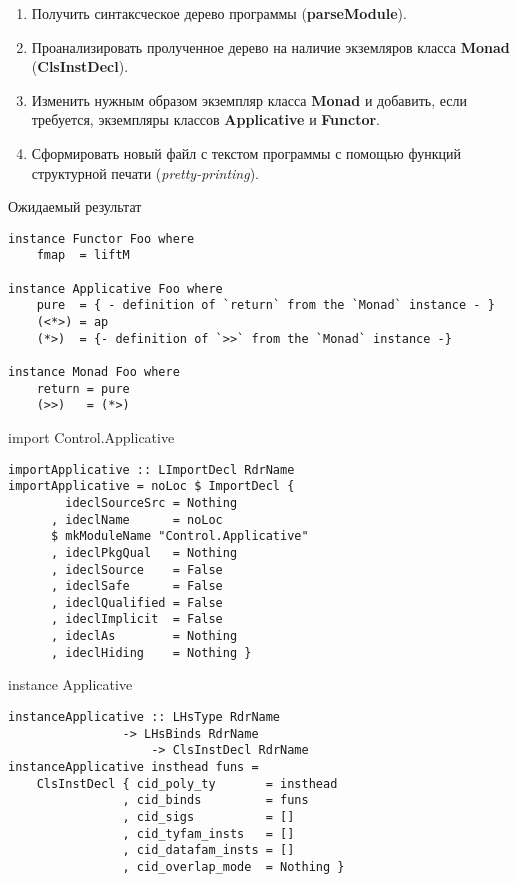 \documentclass [12 pt ] {beamer}
\begin{document}
    \begin{frame}
        \begin{enumerate}
            \item Получить синтаксческое дерево программы 
                (\textbf{parseModule}).
            \item Проанализировать пролученное дерево на наличие 
                экземляров класса \textbf{Monad} (\textbf{ClsInstDecl}).
            \item Изменить нужным образом экземпляр класса \textbf{Monad}
                и добавить, если требуется, экземпляры классов 
                \textbf{Applicative} и \textbf{Functor}.
            \item Сформировать новый файл с текстом программы
                с помощью функций структурной печати 
                (\textit{pretty-printing}).
        \end{enumerate}
    \end{frame}
    
    \begin{frame}[containsverbatim]{Ожидаемый результат}
        \begin{lstlisting}
instance Functor Foo where
    fmap  = liftM

instance Applicative Foo where
    pure  = { - definition of `return` from the `Monad` instance - }
    (<*>) = ap
    (*>)  = {- definition of `>>` from the `Monad` instance -}

instance Monad Foo where
    return = pure
    (>>)   = (*>)
        \end{lstlisting}
    \end{frame}
    
    \begin {frame}[containsverbatim]{import Control.Applicative}
        \begin{lstlisting}
importApplicative :: LImportDecl RdrName
importApplicative = noLoc $ ImportDecl { 
        ideclSourceSrc = Nothing
      , ideclName      = noLoc 
      $ mkModuleName "Control.Applicative"
      , ideclPkgQual   = Nothing
      , ideclSource    = False
      , ideclSafe      = False
      , ideclQualified = False
      , ideclImplicit  = False
      , ideclAs        = Nothing
      , ideclHiding    = Nothing } 
        \end{lstlisting}
    \end {frame}
    
    \begin {frame}[containsverbatim]{instance Applicative}
        \begin{lstlisting}
instanceApplicative :: LHsType RdrName 
                -> LHsBinds RdrName
                    -> ClsInstDecl RdrName
instanceApplicative insthead funs = 
    ClsInstDecl { cid_poly_ty       = insthead
                , cid_binds         = funs
                , cid_sigs          = []
                , cid_tyfam_insts   = []
                , cid_datafam_insts = []
                , cid_overlap_mode  = Nothing }
        \end{lstlisting}
    \end {frame}
    
\end{document}
